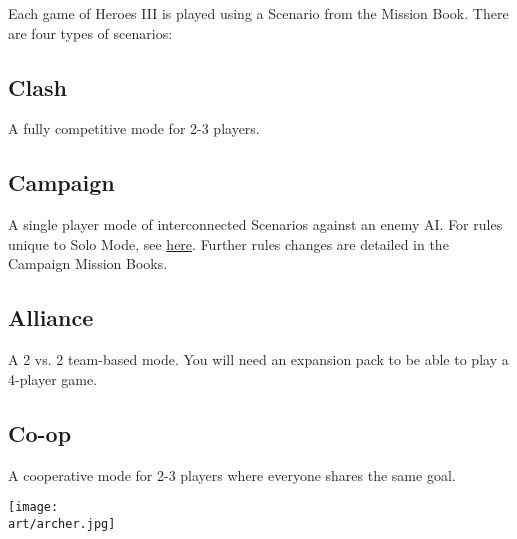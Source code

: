 
\begin{multicols*}{2}

Each game of Heroes III is played using a Scenario from the Mission Book.
There are four types of scenarios:

\subsection*{Clash}
A fully competitive mode for 2-3 players.

\subsection*{Campaign}
A single player mode of interconnected Scenarios against an enemy AI.
For rules unique to Solo Mode, see \hyperlink{AIrules}{here}.
Further rules changes are detailed in the Campaign Mission Books.

\subsection*{Alliance}
A 2 vs. 2 team-based mode.
You will need an expansion pack to be able to play a 4-player game.

\subsection*{Co-op}
A cooperative mode for 2-3 players where everyone shares the same goal.

\vspace*{\fill}

\columnbreak

\texttt{[image: \\art/archer.jpg]}

\end{multicols*}

